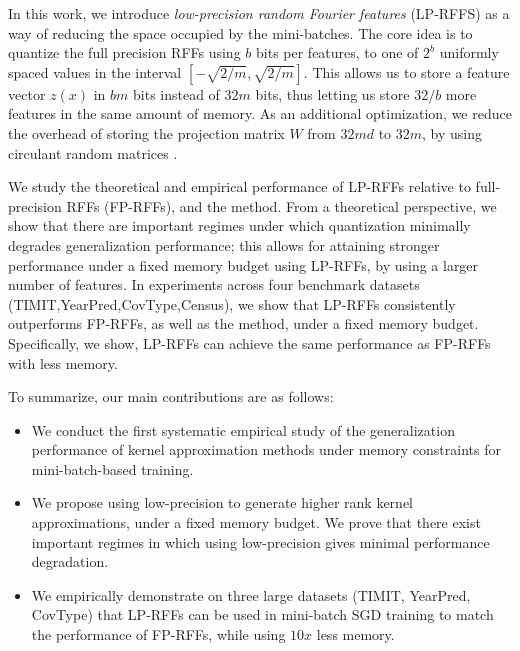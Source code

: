 In this work, we introduce \textit{low-precision random Fourier features} (LP-RFFS) as a way of reducing the space occupied by the mini-batches.  The core idea is to quantize the full precision RFFs using $b$ bits per features, to one of $2^b$ uniformly spaced values in the interval $[-\sqrt{2/m},\sqrt{2/m}]$. This allows us to store a feature vector $z(x)$ in $bm$ bits instead of $32m$ bits, thus letting us store $32/b$ more features in the same amount of memory.  As an additional optimization, we reduce the overhead of storing the projection matrix $W$ from $32md$ to $32m$, by using circulant random matrices \citep{yu15}. 


We study the theoretical and empirical performance of LP-RFFs relative to full-precision RFFs (FP-RFFs), and the \Nystrom method.  From a theoretical perspective, we show that there are important regimes under which quantization minimally degrades generalization performance; this allows for attaining stronger performance under a fixed memory budget using LP-RFFs, by using a larger number of features. In experiments across four benchmark datasets (TIMIT,YearPred,CovType,Census), we show that LP-RFFs consistently outperforms FP-RFFs, as well as the \Nystrom method, under a fixed memory budget. Specifically, we show, LP-RFFs can achieve the same performance as FP-RFFs with  less memory.

To summarize, our main contributions are as follows:
\begin{itemize}
	\item We conduct the first systematic empirical study of the generalization performance of kernel approximation methods under memory constraints for mini-batch-based training.
	\item We propose using low-precision to generate higher rank kernel approximations, under a fixed memory budget. We prove that there exist important regimes in which using low-precision gives minimal performance degradation.
	\item We empirically demonstrate on three large datasets (TIMIT, YearPred, CovType) that LP-RFFs can be used in mini-batch SGD training to match the performance of FP-RFFs, while using $10x$ less memory.
\end{itemize}

